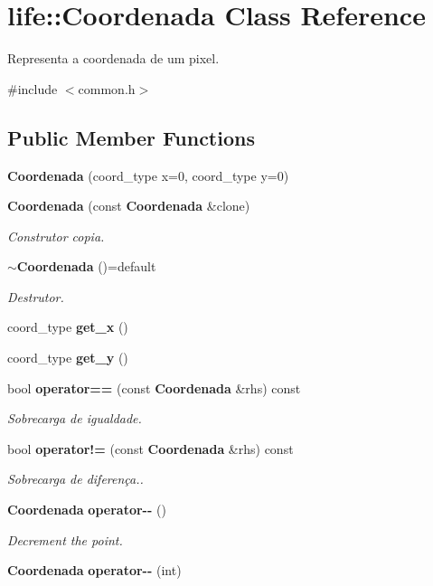 \section{life\+:\+:Coordenada Class Reference}
\label{classlife_1_1_coordenada}


Representa a coordenada de um pixel.  




{\ttfamily \#include $<$common.\+h$>$}

\subsection*{Public Member Functions}
\begin{DoxyCompactItemize}
\item 
\textbf{ Coordenada} (coord\+\_\+type x=0, coord\+\_\+type y=0)
\item 
\mbox{\label{classlife_1_1_coordenada_a7304ae12752ce1244c8af792d39ba67f}} 
\textbf{ Coordenada} (const \textbf{ Coordenada} \&clone)
\begin{DoxyCompactList}\small\item\em Construtor copia. \end{DoxyCompactList}\item 
\mbox{\label{classlife_1_1_coordenada_a84dcd22b361e283b2db2bd238fbbd9af}} 
\textbf{ $\sim$\+Coordenada} ()=default
\begin{DoxyCompactList}\small\item\em Destrutor. \end{DoxyCompactList}\item 
coord\+\_\+type \textbf{ get\+\_\+x} ()
\item 
coord\+\_\+type \textbf{ get\+\_\+y} ()
\item 
\mbox{\label{classlife_1_1_coordenada_a6c49c30e2263710f83a37c3a3c00d55c}} 
bool \textbf{ operator==} (const \textbf{ Coordenada} \&rhs) const
\begin{DoxyCompactList}\small\item\em Sobrecarga de igualdade. \end{DoxyCompactList}\item 
\mbox{\label{classlife_1_1_coordenada_a41fd1ee3173ede7428fee4d85f999d34}} 
bool \textbf{ operator!=} (const \textbf{ Coordenada} \&rhs) const
\begin{DoxyCompactList}\small\item\em Sobrecarga de diferença.. \end{DoxyCompactList}\item 
\mbox{\label{classlife_1_1_coordenada_a6a6b65ae12b925ae43d25bc1aba81b2a}} 
\textbf{ Coordenada} \textbf{ operator-\/-\/} ()
\begin{DoxyCompactList}\small\item\em Decrement the point. \end{DoxyCompactList}\item 
\mbox{\label{classlife_1_1_coordenada_a9509f7ec78be24df42bccd25c1d24950}} 
\textbf{ Coordenada} {\bfseries operator-\/-\/} (int)
\end{DoxyCompactItemize}
